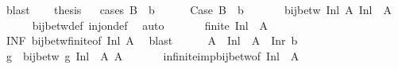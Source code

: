 \begin{isabellebody}
\ blast\isanewline
\ \ \isamarkupfalse%
\ {\isacharquery}{\kern0pt}thesis\isanewline
\ \ \isamarkupfalse%
{\isacharparenleft}{\kern0pt}cases\ {\isachardoublequoteopen}B\ {\isacharequal}{\kern0pt}\ {\isacharbraceleft}{\kern0pt}b{}{\isacharbraceright}{\kern0pt}{\isachardoublequoteclose}{\isacharparenright}{\kern0pt}\isanewline
\ \ \ \ \isamarkupfalse%
\ Case{}{\isacharcolon}{\kern0pt}\ {\isachardoublequoteopen}B\ {\isacharequal}{\kern0pt}\ {\isacharbraceleft}{\kern0pt}b{}{\isacharbraceright}{\kern0pt}{\isachardoublequoteclose}\isanewline
\ \ \ \ \isamarkupfalse%
\ {}{\isacharcolon}{\kern0pt}\ {\isachardoublequoteopen}bij{\isacharunderscore}{\kern0pt}betw\ {\isacharquery}{\kern0pt}Inl\ A\ {\isacharparenleft}{\kern0pt}{\isacharparenleft}{\kern0pt}{\isacharquery}{\kern0pt}Inl\ {\isacharbackquote}{\kern0pt}\ A{\isacharparenright}{\kern0pt}{\isacharparenright}{\kern0pt}{\isachardoublequoteclose}\isanewline
\ \ \ \ \isamarkupfalse%
\ bij{\isacharunderscore}{\kern0pt}betw{\isacharunderscore}{\kern0pt}def\ inj{\isacharunderscore}{\kern0pt}on{\isacharunderscore}{\kern0pt}def\ \isamarkupfalse%
\ auto\isanewline
\ \ \ \ \isamarkupfalse%
\ {}{\isacharcolon}{\kern0pt}\ {\isachardoublequoteopen}{\isasymnot}finite\ {\isacharparenleft}{\kern0pt}{\isacharquery}{\kern0pt}Inl\ {\isacharbackquote}{\kern0pt}\ A{\isacharparenright}{\kern0pt}{\isachardoublequoteclose}\isanewline
\ \ \ \ \isamarkupfalse%
\ INF\ bij{\isacharunderscore}{\kern0pt}betw{\isacharunderscore}{\kern0pt}finite{\isacharbrackleft}{\kern0pt}of\ {\isacharquery}{\kern0pt}Inl\ A{\isacharbrackright}{\kern0pt}\ \isamarkupfalse%
\ blast\isanewline
\ \ \ \ \isamarkupfalse%
\ {\isacharquery}{\kern0pt}A{\isacharprime}{\kern0pt}\ {\isacharequal}{\kern0pt}\ {\isachardoublequoteopen}{\isacharquery}{\kern0pt}Inl\ {\isacharbackquote}{\kern0pt}\ A\ {\isasymunion}\ {\isacharbraceleft}{\kern0pt}{\isacharquery}{\kern0pt}Inr\ b{}{\isacharbraceright}{\kern0pt}{\isachardoublequoteclose}\isanewline
\ \ \ \ \isamarkupfalse%
\ g\ \ {\isachardoublequoteopen}bij{\isacharunderscore}{\kern0pt}betw\ g\ {\isacharparenleft}{\kern0pt}{\isacharquery}{\kern0pt}Inl\ {\isacharbackquote}{\kern0pt}\ A{\isacharparenright}{\kern0pt}\ {\isacharquery}{\kern0pt}A{\isacharprime}{\kern0pt}{\isachardoublequoteclose}\isanewline
\ \ \ \ \isamarkupfalse%
\ {}\ infinite{\isacharunderscore}{\kern0pt}imp{\isacharunderscore}{\kern0pt}bij{\isacharunderscore}{\kern0pt}betw{}{\isacharbrackleft}{\kern0pt}of\ {\isachardoublequoteopen}{\isacharquery}{\kern0pt}Inl\ {\isacharbackquote}{\kern0pt}\ A{\isachardoublequoteclose}{\isacharbrackright}{\kern0pt}\ \isamarkupfalse%

\end{isabellebody}
